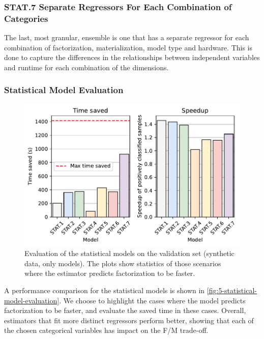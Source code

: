 \subsubsection*{STAT.7 Separate Regressors For Each Combination of Categories}
The last, most granular, ensemble is one that has a separate regressor for each combination of factorization, materialization, model type and hardware. This is done to capture the differences in the relationships between independent variables and runtime for each combination of the dimensions.


\subsubsection{Statistical Model Evaluation}
\begin{figure}[ht]
    \centering
    \includegraphics[width=0.75\linewidth]{chapters/05_cost_estimation/figures/stat-models-compare.pdf}
    \caption[Statistical Model Evaluation]{Evaluation of the statistical models on the validation set (synthetic data, only models). The plots show statistics of those scenarios where the estimator predicts factorization to be faster. }
    \label{fig:5-statistical-model-evaluation}
\end{figure}

A performance comparison for the statistical models is shown in \autoref{fig:5-statistical-model-evaluation}. We choose to highlight the cases where the model predicts factorization to be faster, and evaluate the saved time in these cases. Overall, estimators that fit more distinct regressors perform better, showing that each of the chosen categorical variables has impact on the F/M trade-off.

